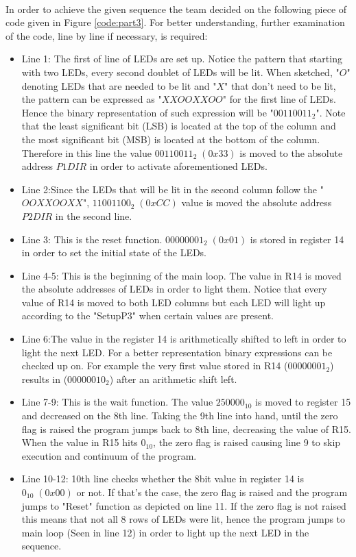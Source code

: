\documentclass[pdftex,12pt,a4paper]{article}
\begin{document}
\paragraph{}
In order to achieve the given sequence the team decided on the following piece of code given in Figure \ref{code:part3}.
For better understanding, further examination of the code, line by line if necessary, is required:
\begin{itemize}
    \item Line 1: The first of line of LEDs are set up. Notice the pattern that starting with two LEDs, every second doublet of LEDs will be lit. When sketched, "$O$" denoting LEDs that are needed to be lit and "$X$" that don't need to be lit, the pattern can be expressed as "$XXOOXXOO$" for the first line of LEDs. Hence the binary representation of such expression will be "$00110011_2$". Note that the least significant bit (LSB) is located at the top of the column and the most significant bit (MSB) is located at the bottom of the column.
    \newline
    Therefore in this line the value $00110011_2\;(0x33)$ is moved to the absolute address $P1DIR$ in order to activate aforementioned LEDs.
    \item Line 2:Since the LEDs that will be lit in the second column follow the "$OOXXOOXX$", $11001100_2\;(0xCC)$ value is moved the absolute address $P2DIR$ in the second line.
    \item Line 3: This is the reset function. $00000001_2\;(0x01)$ is stored in register 14 in order to set the initial state of the LEDs.
    \item Line 4-5: This is the beginning of the main loop. The value in R14 is moved the absolute addresses of LEDs in order to light them. Notice that every value of R14 is moved to both LED columns but each LED will light up according to the "SetupP3" when certain values are present.
    \item Line 6:The value in the register 14 is arithmetically shifted to left in order to light the next LED. For a better representation binary expressions can be checked up on. For example the very first value stored in R14 ($00000001_2$) results in ($00000010_2$) after an arithmetic shift left.
    \item Line 7-9: This is the wait function. The value $250000_{10}$ is moved to register 15 and decreased on the 8th line. Taking the 9th line into hand, until the zero flag is raised the program jumps back to 8th line, decreasing the value of R15. When the value in R15 hits $0_{10}$, the zero flag is raised causing line 9 to skip execution and continuum of the program.
    \item Line 10-12: 10th line checks whether the 8bit value in register 14 is $0_{10}\;(0x00)$ or not. If that's the case, the zero flag is raised and the program jumps to "Reset" function as depicted on line 11. If the zero flag is not raised this means that not all 8 rows of LEDs were lit, hence the program jumps to main loop (Seen in line 12) in order to light up the next LED in the sequence.
\end{itemize}
\end{document}
